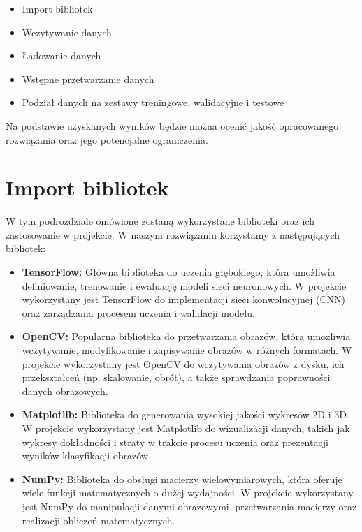 \begin{itemize}
\item Import bibliotek
\item Wczytywanie danych
\item Ładowanie danych
\item Wstępne przetwarzanie danych
\item Podział danych na zestawy treningowe, walidacyjne i testowe
\end{itemize}

Na podstawie uzyskanych wyników będzie można ocenić jakość opracowanego rozwiązania oraz jego potencjalne ograniczenia. 

\section{Import bibliotek}
W tym podrozdziale omówione zostaną wykorzystane biblioteki oraz ich zastosowanie w projekcie. W naszym rozwiązaniu korzystamy z następujących bibliotek:

\begin{itemize}
\item \textbf{TensorFlow:} Główna biblioteka do uczenia głębokiego, która umożliwia definiowanie, trenowanie i ewaluację modeli sieci neuronowych. W projekcie wykorzystany jest TensorFlow do implementacji sieci konwolucyjnej (CNN) oraz zarządzania procesem uczenia i walidacji modelu.

\item \textbf{OpenCV:} Popularna biblioteka do przetwarzania obrazów, która umożliwia wczytywanie, modyfikowanie i zapisywanie obrazów w różnych formatach. W projekcie wykorzystany jest OpenCV do wczytywania obrazów z dysku, ich przekształceń (np. skalowanie, obrót), a także sprawdzania poprawności danych obrazowych.

\item \textbf{Matplotlib:} Biblioteka do generowania wysokiej jakości wykresów 2D i 3D. W projekcie wykorzystany jest Matplotlib do wizualizacji danych, takich jak wykresy dokładności i straty w trakcie procesu uczenia oraz prezentacji wyników klasyfikacji obrazów.

\item \textbf{NumPy:} Biblioteka do obsługi macierzy wielowymiarowych, która oferuje wiele funkcji matematycznych o dużej wydajności. W projekcie wykorzystany jest NumPy do manipulacji danymi obrazowymi, przetwarzania macierzy oraz realizacji obliczeń matematycznych.

\end{itemize}

